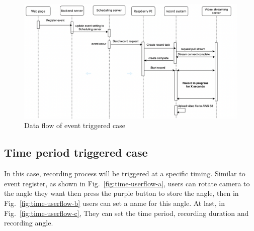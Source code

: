 \begin{figure}[H]
    \centering
    \includegraphics[width=\textwidth]{figsrc/event-sequence-diagram.png}
    \caption{Data flow of event triggered case\label{fig:event-sequence-diagram}}
\end{figure}


\subsection{Time period triggered case}
In this case, recording process will be triggered at a specific timing. Similar to event register, as shown in Fig.~\ref{fig:time-userflow-a}, users can rotate camera to the angle they want then press the purple button to store the angle, then in Fig.~\ref{fig:time-userflow-b} users can set a name for this angle. At last, in Fig.~\ref{fig:time-userflow-c}, They can set the time period, recording duration and recording angle.

